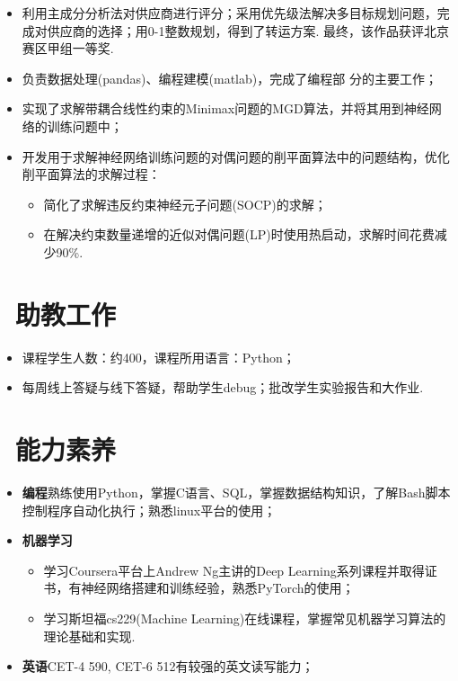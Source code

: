 \documentclass{resume}
\begin{document}
\begin{itemize}
	\item 利用主成分分析法对供应商进行评分；采用优先级法解决多目标规划问题，完成对供应商的选择；用0-1整数规划，得到了转运方案. 最终，该作品获评北京赛区甲组一等奖.
	\item 负责数据处理(pandas)、编程建模(matlab)，完成了编程部
	      分的主要工作；
\end{itemize}

\begin{itemize}
	\item 实现了求解带耦合线性约束的Minimax问题的MGD算法，并将其用到神经网络的训练问题中；
	\item 开发用于求解神经网络训练问题的对偶问题的削平面算法中的问题结构，优化削平面算法的求解过程：
	      \begin{itemize}[label=$\ast$]
		      \item 简化了求解违反约束神经元子问题(SOCP)的求解；
		      \item 在解决约束数量递增的近似对偶问题(LP)时使用热启动，求解时间花费减少90\%.
	      \end{itemize}
\end{itemize}

\section{\faUniversity\ 助教工作}
\begin{itemize}
	\item 课程学生人数：约400，课程所用语言：Python；
	\item 每周线上答疑与线下答疑，帮助学生debug；批改学生实验报告和大作业.
\end{itemize}

\section{\faCogs\ 能力素养}
\begin{itemize}[parsep=0.5ex]
	\item \textbf{编程}\quad 熟练使用Python，掌握C语言、SQL，掌握数据结构知识，了解Bash脚本控制程序自动化执行；熟悉linux平台的使用；
	\item \textbf{机器学习}
	      \begin{itemize}[parsep=0.5ex,label=$\ast$]
		      \item 学习Coursera平台上Andrew Ng主讲的Deep Learning系列课程并取得证书，有神经网络搭建和训练经验，熟悉PyTorch的使用；
		      \item 学习斯坦福cs229(Machine Learning)在线课程，掌握常见机器学习算法的理论基础和实现.
	      \end{itemize}
	\item \textbf{英语}\quad CET-4 590, CET-6 512\quad 有较强的英文读写能力；
\end{itemize}
\end{document}
